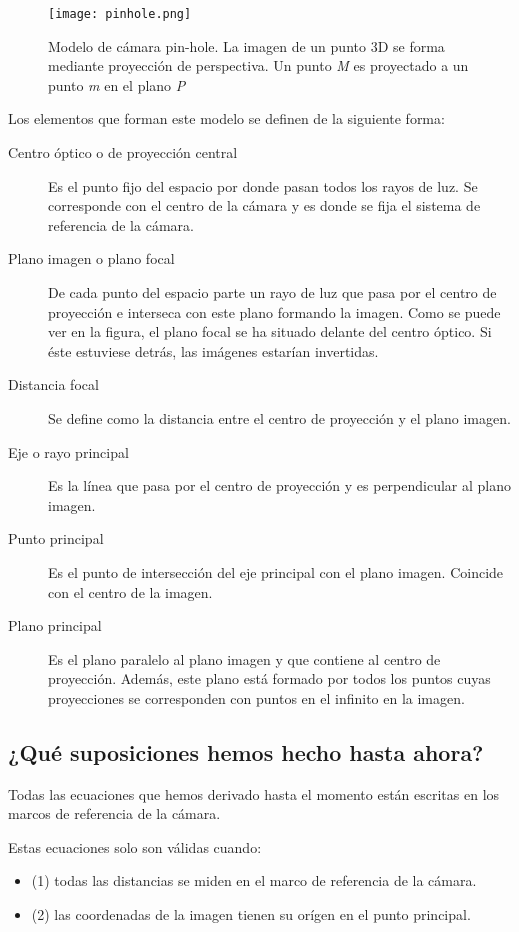 \begin{figure}[h!] 
  \centering
  \texttt{[image: pinhole.png]}
  \caption{Modelo de cámara pin-hole. La imagen de un punto 3D se forma mediante proyección de perspectiva. Un punto \textit{M} es proyectado a un punto \textit{m} en el plano \textit{P}}
  \label{fig:pinholeCamera}
\end{figure}

Los elementos que forman este modelo se definen de la siguiente forma:
\begin{description}
\item[Centro óptico o de proyección central] Es el punto fijo del espacio por donde pasan todos los rayos de luz. Se corresponde con el centro de la cámara y es donde
  se fija el sistema de referencia de la cámara.
\item[Plano imagen o plano focal] De cada punto del espacio parte un rayo de luz que pasa por el centro de proyección e interseca con este plano formando la imagen.
  Como se puede ver en la figura, el plano focal se ha situado delante del centro
  óptico. Si éste estuviese detrás, las imágenes estarían invertidas.
\item[Distancia focal] Se define como la distancia entre el centro de proyección y el plano imagen.
\item[Eje o rayo principal] Es la línea que pasa por el centro de proyección y es perpendicular al plano imagen.
\item[Punto principal] Es el punto de intersección del eje principal con el plano imagen. Coincide con el centro de la imagen.
\item[Plano principal] Es el plano paralelo al plano imagen y que contiene al centro de proyección. Además, este plano está formado por todos los puntos cuyas proyecciones se corresponden con puntos en el infinito en la imagen.
\end{description}


\subsection{¿Qué suposiciones hemos hecho hasta ahora?}


Todas las ecuaciones que hemos derivado hasta el momento están escritas en los marcos de referencia de la cámara.

Estas ecuaciones solo son válidas cuando:
\begin{itemize}
    \item (1) todas las distancias se miden en el marco de referencia de la cámara.
    \item(2) las coordenadas de la imagen tienen su orígen en el punto principal.
\end{itemize}

